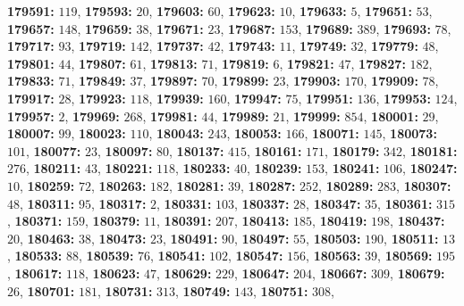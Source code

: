 \textsf{\bfseries 179591:} $119$, \textsf{\bfseries 179593:} $20$, \textsf{\bfseries 179603:} $60$, \textsf{\bfseries 179623:} $10$, \textsf{\bfseries 179633:} $5$, \textsf{\bfseries 179651:} $53$, \textsf{\bfseries 179657:} $148$, \textsf{\bfseries 179659:} $38$, \textsf{\bfseries 179671:} $23$, \textsf{\bfseries 179687:} $153$, \textsf{\bfseries 179689:} $389$, \textsf{\bfseries 179693:} $78$, \textsf{\bfseries 179717:} $93$, \textsf{\bfseries 179719:} $142$, \textsf{\bfseries 179737:} $42$, \textsf{\bfseries 179743:} $11$, \textsf{\bfseries 179749:} $32$, \textsf{\bfseries 179779:} $48$, \textsf{\bfseries 179801:} $44$, \textsf{\bfseries 179807:} $61$, \textsf{\bfseries 179813:} $71$, \textsf{\bfseries 179819:} $6$, \textsf{\bfseries 179821:} $47$, \textsf{\bfseries 179827:} $182$, \textsf{\bfseries 179833:} $71$, \textsf{\bfseries 179849:} $37$, \textsf{\bfseries 179897:} $70$, \textsf{\bfseries 179899:} $23$, \textsf{\bfseries 179903:} $170$, \textsf{\bfseries 179909:} $78$, \textsf{\bfseries 179917:} $28$, \textsf{\bfseries 179923:} $118$, \textsf{\bfseries 179939:} $160$, \textsf{\bfseries 179947:} $75$, \textsf{\bfseries 179951:} $136$, \textsf{\bfseries 179953:} $124$, \textsf{\bfseries 179957:} $2$, \textsf{\bfseries 179969:} $268$, \textsf{\bfseries 179981:} $44$, \textsf{\bfseries 179989:} $21$, \textsf{\bfseries 179999:} $854$, \textsf{\bfseries 180001:} $29$, \textsf{\bfseries 180007:} $99$, \textsf{\bfseries 180023:} $110$, \textsf{\bfseries 180043:} $243$, \textsf{\bfseries 180053:} $166$, \textsf{\bfseries 180071:} $145$, \textsf{\bfseries 180073:} $101$, \textsf{\bfseries 180077:} $23$, \textsf{\bfseries 180097:} $80$, \textsf{\bfseries 180137:} $415$, \textsf{\bfseries 180161:} $171$, \textsf{\bfseries 180179:} $342$, \textsf{\bfseries 180181:} $276$, \textsf{\bfseries 180211:} $43$, \textsf{\bfseries 180221:} $118$, \textsf{\bfseries 180233:} $40$, \textsf{\bfseries 180239:} $153$, \textsf{\bfseries 180241:} $106$, \textsf{\bfseries 180247:} $10$, \textsf{\bfseries 180259:} $72$, \textsf{\bfseries 180263:} $182$, \textsf{\bfseries 180281:} $39$, \textsf{\bfseries 180287:} $252$, \textsf{\bfseries 180289:} $283$, \textsf{\bfseries 180307:} $48$, \textsf{\bfseries 180311:} $95$, \textsf{\bfseries 180317:} $2$, \textsf{\bfseries 180331:} $103$, \textsf{\bfseries 180337:} $28$, \textsf{\bfseries 180347:} $35$, \textsf{\bfseries 180361:} $315$, \textsf{\bfseries 180371:} $159$, \textsf{\bfseries 180379:} $11$, \textsf{\bfseries 180391:} $207$, \textsf{\bfseries 180413:} $185$, \textsf{\bfseries 180419:} $198$, \textsf{\bfseries 180437:} $20$, \textsf{\bfseries 180463:} $38$, \textsf{\bfseries 180473:} $23$, \textsf{\bfseries 180491:} $90$, \textsf{\bfseries 180497:} $55$, \textsf{\bfseries 180503:} $190$, \textsf{\bfseries 180511:} $13$, \textsf{\bfseries 180533:} $88$, \textsf{\bfseries 180539:} $76$, \textsf{\bfseries 180541:} $102$, \textsf{\bfseries 180547:} $156$, \textsf{\bfseries 180563:} $39$, \textsf{\bfseries 180569:} $195$, \textsf{\bfseries 180617:} $118$, \textsf{\bfseries 180623:} $47$, \textsf{\bfseries 180629:} $229$, \textsf{\bfseries 180647:} $204$, \textsf{\bfseries 180667:} $309$, \textsf{\bfseries 180679:} $26$, \textsf{\bfseries 180701:} $181$, \textsf{\bfseries 180731:} $313$, \textsf{\bfseries 180749:} $143$, \textsf{\bfseries 180751:} $308$, 

